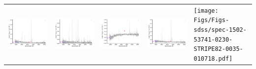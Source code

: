 \begin{center}
\begin{longtable}{l l l l l }
    \includegraphics[width=0.19\linewidth, clip]{Figs/Figs-sdss/spec-1474-52933-0189-STRIPE82-0129-024346.pdf} & \includegraphics[width=0.19\linewidth, clip]{Figs/Figs-sdss/spec-1474-52933-0296-STRIPE82-0127-008930.pdf} & \includegraphics[width=0.19\linewidth, clip]{Figs/Figs-sdss/spec-1475-52903-0561-STRIPE82-0134-039543.pdf} & \includegraphics[width=0.19\linewidth, clip]{Figs/Figs-sdss/spec-1476-52964-0017-SPLUS-s02s08-040860.pdf} & \texttt{[image: Figs/Figs-sdss/spec-1502-53741-0230-STRIPE82-0035-010718.pdf]} \\

\end{longtable}
\end{center}

